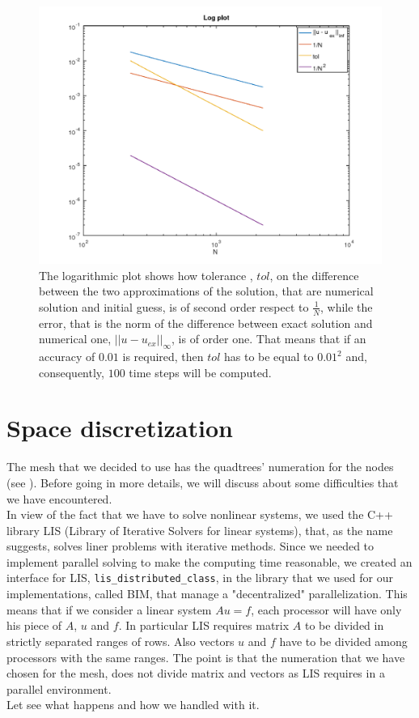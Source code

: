 \begin{figure}[h]
	\centering
	\includegraphics[width=1\linewidth]{time_order}
	\caption[Logarithmic plot of convergence orders is time adaptivity]{The logarithmic plot shows how tolerance , $ tol $, on the difference between the two approximations of the solution, that are numerical solution and initial guess, is of second order respect to $ \frac{1}{N} $, while the error, that is the norm of the difference between exact solution and numerical one, $|| u -u _{ex}||_{\infty}$, is of order one. That means that if an accuracy of $ 0.01 $ is required, then $tol$ has to be equal to $ 0.01^2 $ and, consequently, $ 100 $ time steps will be computed. }
	\label{time_order}
\end{figure}
\section{Space discretization}
The mesh that we decided to use has the quadtrees' numeration for the nodes (see \cite{p4est}). Before going in more details, we will discuss about some difficulties that we have encountered. \\
In view of the fact that we have to solve nonlinear systems, we used the C++ library LIS (Library of Iterative Solvers for linear systems), that, as the name suggests, solves liner problems with iterative methods. Since we needed to implement parallel solving to make the computing time reasonable, we created an interface for LIS, \texttt{lis\_distributed\_class}, in the library that we used for our implementations, called BIM, that manage a "decentralized" parallelization. This means that if we consider a linear system $ A u = f $, each processor will have  only his piece of $ A $, $ u $ and $ f $. In particular LIS requires matrix $ A $ to be divided in strictly separated ranges of rows. Also vectors $ u $ and $ f $ have to be divided among processors with the same ranges. The point is that the numeration that we have chosen for the mesh, does not divide matrix and vectors as LIS requires in a parallel environment. \\
Let see what happens and how we handled with it.
